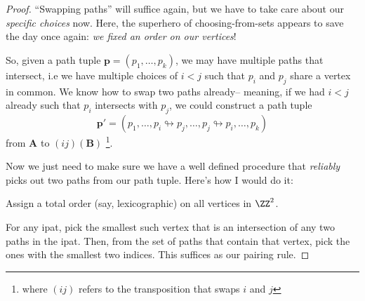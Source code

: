 \documentclass{article}
\begin{document}
\begin{proof}
    ``Swapping paths'' will suffice again, but we have to take care about our \textit{specific choices} now. 
    Here, the superhero of choosing-from-sets appears to save the day once again: \textit{we fixed an order on our vertices}!

    So, given a path tuple $\mathbf{p} = (p_1,\ldots,p_k)$, we may have multiple paths that intersect, i.e we have multiple choices of $i<j$ such that $p_i$ and $p_j$ share a vertex in common. 
    We know how to swap two paths already-- meaning, if we had $i<j$ already such that $p_i$ intersects with $p_j$, we could construct a path tuple
    \[
        \mathbf{p'} = (p_1,\ldots,p_i \looparrowright p_j,\ldots,p_j \looparrowright p_i, \ldots, p_k)
    \]
    from $\mathbf{A}$ to $(ij)(\mathbf{B})$
    \footnote{where $(ij)$ refers to the transposition that swaps $i$ and $j$}.

    Now we just need to make sure we have a well defined procedure that \textit{reliably} picks out two paths from our path tuple. Here's how I would do it:

    Assign a total order (say, lexicographic) on all vertices in $\ZZ^2$.

    For any ipat, pick the smallest such vertex that is an intersection of any two paths in the ipat. 
    Then, from the set of paths that contain that vertex, pick the ones with the smallest two indices. 
    This suffices as our pairing rule.

\end{proof}
\end{document}
